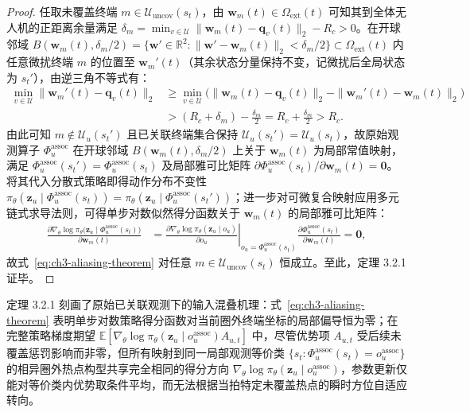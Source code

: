 \begin{proof}
任取未覆盖终端 $m\in\mathcal{U}_{\mathrm{uncov}}(s_t)$，由 $\mathbf{w}_m(t)\in\Omega_{\mathrm{ext}}(t)$ 可知其到全体无人机的正距离余量满足 $\delta_m=\min_{v\in\mathcal{U}}\|\mathbf{w}_m(t)-\mathbf{q}_v(t)\|_2-R_c>0$。在开球邻域 $B(\mathbf{w}_m(t),\delta_m/2)=\{\mathbf{w}'\in\mathbb{R}^2:\|\mathbf{w}'-\mathbf{w}_m(t)\|_2<\delta_m/2\}\subset\Omega_{\mathrm{ext}}(t)$ 内任意微扰终端 $m$ 的位置至 $\mathbf{w}_m'(t)$（其余状态分量保持不变，记微扰后全局状态为 $s_t'$），由逆三角不等式有：
\begin{align*}
    \min_{v\in\mathcal{U}}\|\mathbf{w}_m'(t)-\mathbf{q}_v(t)\|_2
    &\geq\min_{v\in\mathcal{U}}\Big(\|\mathbf{w}_m(t)-\mathbf{q}_v(t)\|_2-\|\mathbf{w}_m'(t)-\mathbf{w}_m(t)\|_2\Big) \\
    &>(R_c+\delta_m)-\frac{\delta_m}{2}=R_c+\frac{\delta_m}{2}>R_c.
\end{align*}
由此可知 $m\notin\mathcal{U}_u(s_t')$ 且已关联终端集合保持 $\mathcal{U}_u(s_t')=\mathcal{U}_u(s_t)$，故原始观测算子 $\Phi_u^{\mathrm{assoc}}$ 在开球邻域 $B(\mathbf{w}_m(t),\delta_m/2)$ 上关于 $\mathbf{w}_m(t)$ 为局部常值映射，满足 $\Phi_u^{\mathrm{assoc}}(s_t')=\Phi_u^{\mathrm{assoc}}(s_t)$ 及局部雅可比矩阵 $\partial\Phi_u^{\mathrm{assoc}}(s_t)/\partial\mathbf{w}_m(t)=\mathbf{0}$。将其代入分散式策略即得动作分布不变性 $\pi_\theta(\mathbf{z}_u\mid\Phi_u^{\mathrm{assoc}}(s_t))=\pi_\theta(\mathbf{z}_u\mid\Phi_u^{\mathrm{assoc}}(s_t'))$；进一步对可微复合映射应用多元链式求导法则，可得单步对数似然得分函数关于 $\mathbf{w}_m(t)$ 的局部雅可比矩阵：
\begin{align*}
    \frac{\partial\nabla_\theta\log\pi_\theta\big(\mathbf{z}_u\mid\Phi_u^{\mathrm{assoc}}(s_t)\big)}{\partial\mathbf{w}_m(t)}
    &=\left.\frac{\partial\nabla_\theta\log\pi_\theta(\mathbf{z}_u\mid o_u)}{\partial o_u}\right|_{o_u=\Phi_u^{\mathrm{assoc}}(s_t)}
      \frac{\partial\Phi_u^{\mathrm{assoc}}(s_t)}{\partial\mathbf{w}_m(t)}=\mathbf{0},
\end{align*}
故式~\eqref{eq:ch3-aliasing-theorem} 对任意 $m\in\mathcal{U}_{\mathrm{uncov}}(s_t)$ 恒成立。至此，定理 3.2.1 证毕。
\end{proof}

定理 3.2.1 刻画了原始已关联观测下的输入混叠机理：式~\eqref{eq:ch3-aliasing-theorem} 表明单步对数策略得分函数对当前圈外终端坐标的局部偏导恒为零；在完整策略梯度期望 $\mathbb{E}[\nabla_\theta\log\pi_\theta(\mathbf{z}_u\mid o_u^{\mathrm{assoc}})A_{u,t}]$ 中，尽管优势项 $A_{u,t}$ 受后续未覆盖惩罚影响而非零，但所有映射到同一局部观测等价类 $\{s_t:\Phi_u^{\mathrm{assoc}}(s_t)=o_u^{\mathrm{assoc}}\}$ 的相异圈外热点构型共享完全相同的得分方向 $\nabla_\theta\log\pi_\theta(\mathbf{z}_u\mid o_u^{\mathrm{assoc}})$，参数更新仅能对等价类内优势取条件平均，而无法根据当拍特定未覆盖热点的瞬时方位自适应转向。

